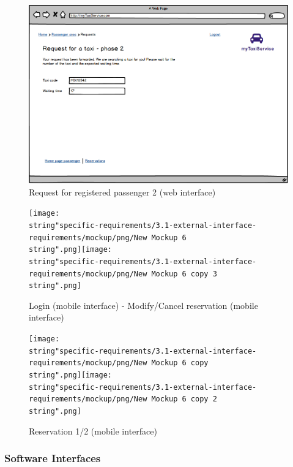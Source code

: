 \begin{figure}[H]
\centering{}\includegraphics[scale=0.4]{specific-requirements/3.1-external-interface-requirements/mockup/png/request2}\protect\caption{Request for registered passenger 2 (web interface)}
\end{figure}


\begin{figure}[H]
\centering{}\texttt{[image: \\string"specific-requirements/3.1-external-interface-requirements/mockup/png/New Mockup 6\\string".png]}\texttt{[image: \\string"specific-requirements/3.1-external-interface-requirements/mockup/png/New Mockup 6 copy 3\\string".png]}\protect\caption{Login (mobile interface) - Modify/Cancel reservation (mobile interface)}
\end{figure}


\begin{figure}[H]
\centering{}\texttt{[image: \\string"specific-requirements/3.1-external-interface-requirements/mockup/png/New Mockup 6 copy\\string".png]}\texttt{[image: \\string"specific-requirements/3.1-external-interface-requirements/mockup/png/New Mockup 6 copy 2\\string".png]}\protect\caption{Reservation 1/2 (mobile interface)}
\end{figure}



\subsubsection{Software Interfaces }

